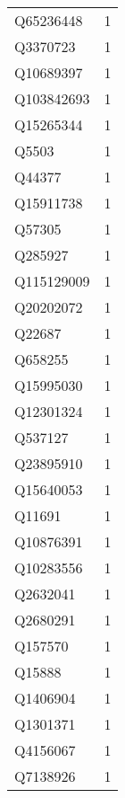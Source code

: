 \begin{tabular}{lr}
   Q65236448 &                             1 \\
    Q3370723 &                             1 \\
   Q10689397 &                             1 \\
  Q103842693 &                             1 \\
   Q15265344 &                             1 \\
       Q5503 &                             1 \\
      Q44377 &                             1 \\
   Q15911738 &                             1 \\
      Q57305 &                             1 \\
     Q285927 &                             1 \\
  Q115129009 &                             1 \\
   Q20202072 &                             1 \\
      Q22687 &                             1 \\
     Q658255 &                             1 \\
   Q15995030 &                             1 \\
   Q12301324 &                             1 \\
     Q537127 &                             1 \\
   Q23895910 &                             1 \\
   Q15640053 &                             1 \\
      Q11691 &                             1 \\
   Q10876391 &                             1 \\
   Q10283556 &                             1 \\
    Q2632041 &                             1 \\
    Q2680291 &                             1 \\
     Q157570 &                             1 \\
      Q15888 &                             1 \\
    Q1406904 &                             1 \\
    Q1301371 &                             1 \\
    Q4156067 &                             1 \\
    Q7138926 &                             1 \\

\end{tabular}
